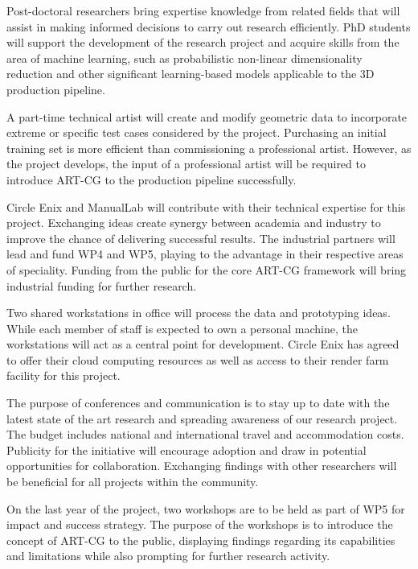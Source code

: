 \documentclass[a4paper, 11pt, onecolumn]{article} %
\numberwithin{equation}{section} %
\numberwithin{figure}{section} %
\numberwithin{table}{section} %
\begin{document}
Post-doctoral researchers bring expertise knowledge from related fields that will assist in making informed decisions to carry out research efficiently. PhD students will support the development of the research project and acquire skills from the area of machine learning, such as probabilistic non-linear dimensionality reduction and other significant learning-based models applicable to the 3D production pipeline.

A part-time technical artist will create and modify geometric data to incorporate extreme or specific test cases considered by the project. Purchasing an initial training set is more efficient than commissioning a professional artist. However, as the project develops, the input of a professional artist will be required to introduce ART-CG to the production pipeline successfully.

Circle Enix and ManualLab will contribute with their technical expertise for this project. Exchanging ideas create synergy between academia and industry to improve the chance of delivering successful results. The industrial partners will lead and fund WP4 and WP5, playing to the advantage in their respective areas of speciality. Funding from the public for the core ART-CG framework will bring industrial funding for further research.

Two shared workstations in office will process the data and prototyping ideas. While each member of staff is expected to own a personal machine, the workstations will act as a central point for development. Circle Enix has agreed to offer their cloud computing resources as well as access to their render farm facility for this project.

The purpose of conferences and communication is to stay up to date with the latest state of the art research and spreading awareness of our research project. The budget includes national and international travel and accommodation costs. Publicity for the initiative will encourage adoption and draw in potential opportunities for collaboration. Exchanging findings with other researchers will be beneficial for all projects within the community.

On the last year of the project, two workshops are to be held as part of WP5 for impact and success strategy. The purpose of the workshops is to introduce the concept of ART-CG to the public, displaying findings regarding its capabilities and limitations while also prompting for further research activity.

\newpage
\end{document}

